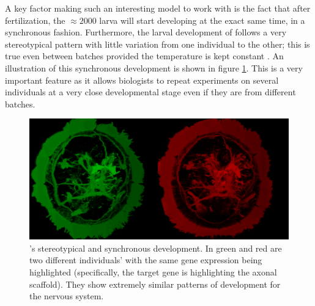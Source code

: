     A key factor making \platy{} such an interesting model to work with is the fact that after fertilization, the $\approx 2000$ larva will start developing at the exact same time, in a synchronous fashion. Furthermore, the larval development of \platy{} follows a very stereotypical pattern with little variation from one individual to the other; this is true even between batches provided the temperature is kept constant \cite{fischer04,dorresteijn90}. An illustration of this synchronous development is shown in figure \ref{fig:brain_comparison}. This is a very important feature as it allows biologists to repeat experiments on several individuals at a very close developmental stage even if they are from different batches.\\
    
\begin{figure}[bth]
  \includegraphics[width=\linewidth]{gfx/chapter1/brain_comparison.png}
  \caption{\platyfull{}'s stereotypical and synchronous development. In green and red are two different \platy{} individuals' with the same gene expression being highlighted (specifically, the target gene is  highlighting the axonal scaffold). They show extremely similar patterns of development for the nervous system.}
  \label{fig:brain_comparison}
\end{figure}

	 

